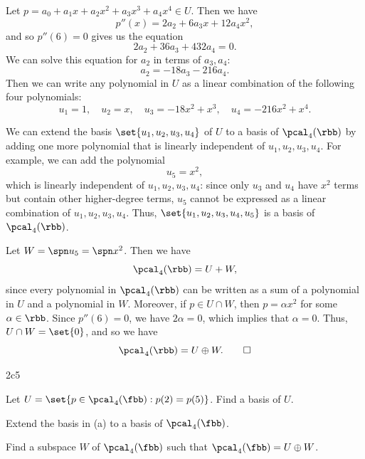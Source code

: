 \begin{solenum}
    \item Let $p = a_0 + a_1 x + a_2 x^2 + a_3 x^3 + a_4 x^4 \in U$.
	Then we have
    \[
    	p''(x) = 2a_2 + 6a_3 x + 12a_4 x^2,
    \]
    and so $p''(6) = 0$ gives us the equation
    \[
    	2a_2 + 36a_3 + 432a_4 = 0.
    \]
    We can solve this equation for $a_2$ in terms of $a_3, a_4$:
    \[
    	a_2 = -18a_3 - 216a_4.
    \]
    Then we can write any polynomial in $U$ as a linear combination of the following four polynomials:
    \[
    	u_1 = 1, \quad u_2 = x, \quad u_3 = -18x^2 + x^3, \quad u_4 = -216x^2 + x^4.
    \]
    \item We can extend the basis $\set{u_1, u_2, u_3, u_4}$ of $U$ to a basis of $\pcal_4(\rbb)$ by adding one more polynomial that is linearly independent of $u_1, u_2, u_3, u_4$.
	For example, we can add the polynomial
    \[
    	u_5 = x^2,
    \]
    which is linearly independent of $u_1, u_2, u_3, u_4$: since only $u_3$ and $u_4$ have $x^2$ terms but contain other higher-degree terms, $u_5$ cannot be expressed as a linear combination of $u_1, u_2, u_3, u_4$.
	Thus, $\set{u_1, u_2, u_3, u_4, u_5}$ is a basis of $\pcal_4(\rbb)$.
    \item Let $W = \spn u_5 = \spn x^2$.
	Then we have
    \[
    	\pcal_4(\rbb) = U + W,
    \]
    since every polynomial in $\pcal_4(\rbb)$ can be written as a sum of a polynomial in $U$ and a polynomial in $W$.
	Moreover, if $p \in U \cap W$, then $p = \alpha x^2$ for some $\alpha \in \rbb$.
	Since $p''(6) = 0$, we have $2\alpha = 0$, which implies that $\alpha = 0$.
	Thus, $U \cap W = \set{0}$, and so we have
    \[
    	\pcal_4(\rbb) = U \oplus W. \qedhere
    \]
\end{solenum}

\begin{exercise}{2c5}
    \begin{subexercises}
        \item Let $U = \set{p \in \pcal_4(\fbb) : p(2) = p(5)}$.
	Find a basis of $U$.
        \item Extend the basis in (a) to a basis of $\pcal_4(\fbb)$.
        \item Find a subspace $W$ of $\pcal_4(\fbb)$ such that $\pcal_4(\fbb) = U \oplus W$.
    \end{subexercises}
\end{exercise}

